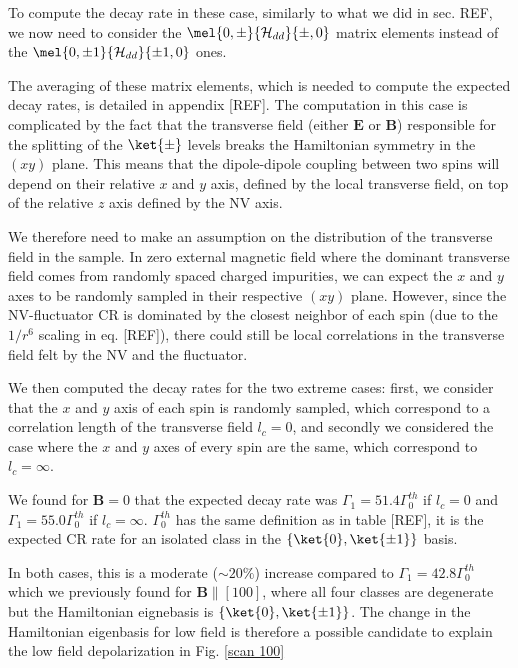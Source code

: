 \documentclass[a4paper,11pt]{report}
\begin{document}
To compute the decay rate in these case, similarly to what we did in sec. REF, we now need to consider the $\mel{0,\pm}{\mathcal{H}_{dd}}{\pm ,0}$ matrix elements instead of the $\mel{0,\pm 1}{\mathcal{H}_{dd}}{\pm 1,0}$ ones.

The averaging of these matrix elements, which is needed to compute the expected decay rates, is detailed in appendix [REF]. The computation in this case is complicated by the fact that the transverse field (either $\mathbf{E}$ or $\mathbf{B}$) responsible for the splitting of the $\ket{\pm}$ levels breaks the Hamiltonian symmetry in the $(xy)$ plane. This means that the dipole-dipole coupling between two spins will depend on their relative $x$ and $y$ axis, defined by the local transverse field, on top of the relative $z$ axis defined by the NV axis. 

We therefore need to make an assumption on the distribution of the transverse field in the sample. In zero external magnetic field where the dominant transverse field comes from randomly spaced charged impurities, we can expect the $x$ and $y$ axes to be randomly sampled in their respective $(xy)$ plane. However, since the NV-fluctuator CR is dominated by the closest neighbor of each spin (due to the $1/r^6$ scaling in eq. [REF]), there could still be local correlations in the transverse field felt by the NV and the fluctuator.

We then computed the decay rates for the two extreme cases: first, we consider that the $x$ and $y$ axis of each spin is randomly sampled, which correspond to a correlation length of the transverse field $l_c=0$, and secondly we considered the case where the $x$ and $y$ axes of every spin are the same, which correspond to $l_c=\infty$.

We found for $\mathbf{B}=0$ that the expected decay rate was $\Gamma_1=51.4 \Gamma_0^{th}$ if $l_c=0$ and $\Gamma_1=55.0 \Gamma_0^{th}$ if $l_c=\infty$. $\Gamma_0^{th}$ has the same definition as in table [REF], it is the expected CR rate for an isolated class in the $\{ \ket{0}, \ket{\pm 1} \}$ basis.

In both cases, this is a moderate ($\sim 20 \%$) increase compared to $\Gamma_1=42.8 \Gamma_0^{th}$ which we previously found for $\mathbf{B} \parallel [100]$, where all four classes are degenerate but the Hamiltonian eignebasis is $\{ \ket{0}, \ket{\pm 1} \}$. The change in the Hamiltonian eigenbasis for low field is therefore a possible candidate to explain the low field depolarization in Fig. \ref{scan 100}
\end{document}
